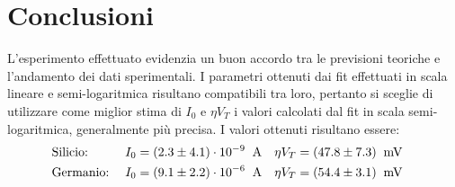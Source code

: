 \documentclass[@SRC@/main]{subfiles}
\begin{document}
    \section{Conclusioni} \label{sec:conclusioni}

    L'esperimento effettuato evidenzia un buon accordo tra le previsioni teoriche e l'andamento dei dati sperimentali. I
    parametri ottenuti dai fit effettuati in scala lineare e semi-logaritmica risultano compatibili tra loro, pertanto si
    sceglie di utilizzare come miglior stima di $I_{0}$ e $\eta V_{T}$ i valori calcolati dal fit in scala semi-logaritmica,
    generalmente più precisa. \newline\newline
    I valori ottenuti risultano essere:
    \begin{align*}
        &\textnormal{Silicio:} \;
        &I_{0} &= (2.3 \pm 4.1)\cdot 10^{-9} \;\;\textnormal{A} &
        \eta V_{T} &= (47.8 \pm 7.3)\;\;\textnormal{mV} & \\
        &\textnormal{Germanio:} \;
        &I_{0} &= (9.1\pm 2.2) \cdot 10^{-6} \;\;\textnormal{A} &
        \eta V_{T} &= (54.4 \pm 3.1)\;\;\textnormal{mV} &
    \end{align*}
\end{document}
